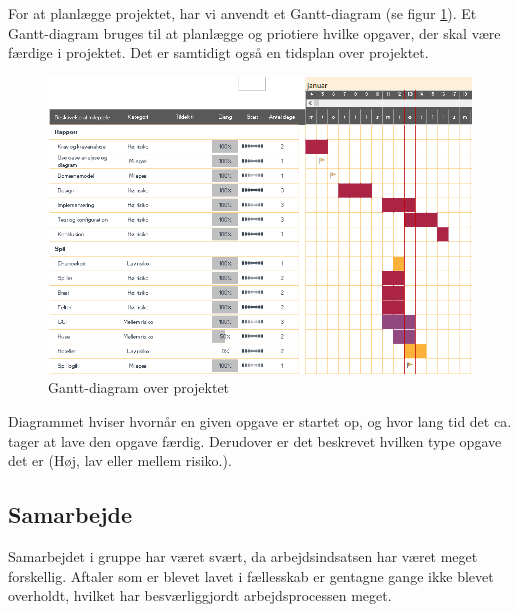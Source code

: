For at planlægge projektet, har vi anvendt et Gantt-diagram (se figur \ref{fig:gantt}). Et Gantt-diagram bruges til at planlægge og priotiere hvilke opgaver, der skal være færdige i projektet. Det er samtidigt også en tidsplan over projektet.

\begin{figure}[h]
    \centering
    \includegraphics[width=\textwidth]{sources/gantt.PNG}
    \caption{Gantt-diagram over projektet}
    \label{fig:gantt}
\end{figure}

Diagrammet hviser hvornår en given opgave er startet op, og hvor lang tid det ca. tager at lave den opgave færdig. Derudover er det beskrevet hvilken type opgave det er (Høj, lav eller mellem risiko.). 

\subsection{Samarbejde}
Samarbejdet i gruppe har været svært, da arbejdsindsatsen har været meget forskellig. Aftaler som er blevet lavet i fællesskab er gentagne gange ikke blevet overholdt, hvilket har besværliggjordt arbejdsprocessen meget. 
